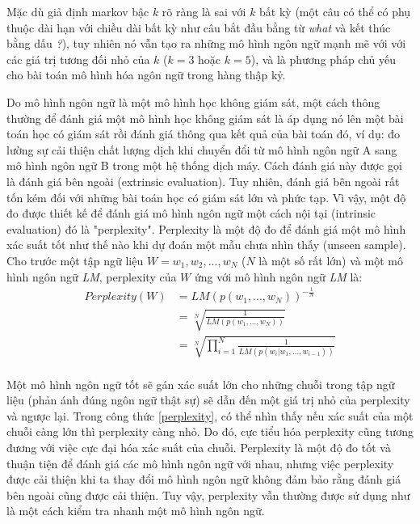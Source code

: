 Mặc dù giả định markov bậc $k$ rõ ràng là sai với $k$ bất kỳ (một câu có thể có phụ thuộc dài hạn với chiều dài bất kỳ như câu bắt đầu bằng từ \textit{what} và kết thúc bằng dấu \textit{?}), tuy nhiên nó vẫn tạo ra những mô hình ngôn ngữ mạnh mẽ với với các giá trị tương đối nhỏ của $k$ ($k=3$ hoặc $k=5$), và là phương pháp chủ yếu cho bài toán mô hình hóa ngôn ngữ trong hàng thập kỷ.

Do mô hình ngôn ngữ là một mô hình học không giám sát, một cách thông thường để đánh giá một mô hình học không giám sát là áp dụng nó lên một bài toán học có giám sát rồi đánh giá thông qua kết quả của bài toán đó, ví dụ: đo lường sự cải thiện chất lượng dịch khi chuyển đổi từ mô hình ngôn ngữ A sang mô hình ngôn ngữ B trong một hệ thống dịch máy. Cách đánh giá này được gọi là đánh giá bên ngoài (extrinsic evaluation). Tuy nhiên, đánh giá bên ngoài rất tốn kém đối với những bài toán học có giám sát lớn và phức tạp. Vì vậy, một độ đo được thiết kế để đánh giá mô hình ngôn ngữ một cách nội tại (intrinsic evaluation) đó là "perplexity". Perplexity là một độ đo để đánh giá một mô hình xác suất tốt như thế nào khi dự đoán một mẫu chưa nhìn thấy (unseen sample). Cho trước một tập ngữ liệu $ W = w_1, w_2, ..., w_N$ ($N$ là một số rất lớn) và một mô hình ngôn ngữ \textit{LM}, perplexity của $W$ ứng với mô hình ngôn ngữ \textit{LM} là:
\begin{equation} \label{perplexity}
\begin{split}
Perplexity(W) &= LM \left(p(w_1,...,w_N) \right)^{-\frac{1}{N}} \\
&= \sqrt[N]{\frac{1}{LM(p(w_1,...,w_N))}} \\
&= \sqrt[N]{\prod_{i=1}^{N}  \frac{1}{LM(p(w_i|w_1,...,w_{i-1}))}} \\
\end{split}
\end{equation}

Một mô hình ngôn ngữ tốt sẽ gán xác suất lớn cho những chuỗi trong tập ngữ liệu (phản ánh đúng ngôn ngữ thật sự) sẽ dẫn đến một giá trị nhỏ của perplexity và ngược lại. Trong công thức \ref{perplexity}, có thể nhìn thấy nếu xác suất của một chuỗi càng lớn thì perplexity càng nhỏ. Do đó, cực tiểu hóa perplexity cũng tương đương với việc cực đại hóa xác suất của chuỗi. Perplexity là một độ đo tốt và thuận tiện để đánh giá các mô hình ngôn ngữ với nhau, nhưng việc perplexity được cải thiện khi ta thay đổi mô hình ngôn ngữ không đảm bảo rằng đánh giá bên ngoài cũng được cải thiện. Tuy vậy, perplexity vẫn thường được sử dụng như là một cách kiểm tra nhanh một mô hình ngôn ngữ. 

